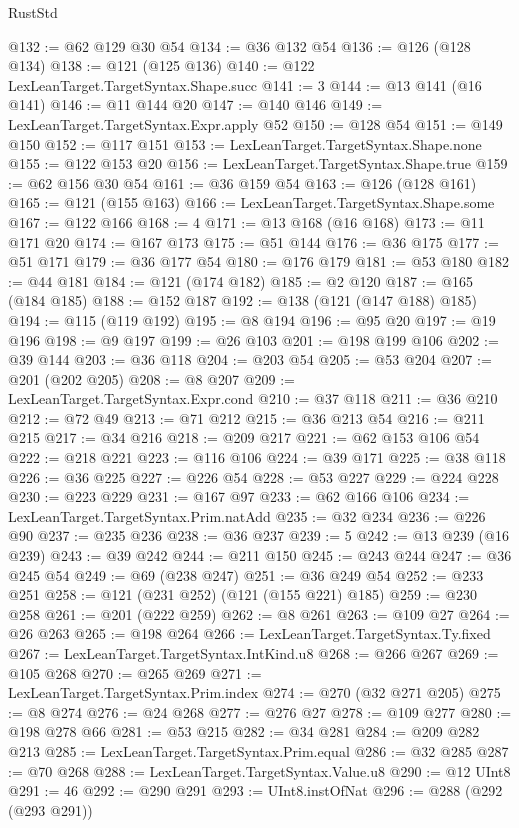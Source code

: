 \begin{lexlean}{RustStd}
\begin{coremodule}
@132 := @62 @129 @30 @54
@134 := @36 @132 @54
@136 := @126 (@128 @134)
@138 := @121 (@125 @136)
@140 := @122 LexLeanTarget.TargetSyntax.Shape.succ
@141 := 3
@144 := @13 @141 (@16 @141)
@146 := @11 @144 @20
@147 := @140 @146
@149 := LexLeanTarget.TargetSyntax.Expr.apply @52
@150 := @128 @54
@151 := @149 @150
@152 := @117 @151
@153 := LexLeanTarget.TargetSyntax.Shape.none
@155 := @122 @153 @20
@156 := LexLeanTarget.TargetSyntax.Shape.true
@159 := @62 @156 @30 @54
@161 := @36 @159 @54
@163 := @126 (@128 @161)
@165 := @121 (@155 @163)
@166 := LexLeanTarget.TargetSyntax.Shape.some
@167 := @122 @166
@168 := 4
@171 := @13 @168 (@16 @168)
@173 := @11 @171 @20
@174 := @167 @173
@175 := @51 @144
@176 := @36 @175
@177 := @51 @171
@179 := @36 @177 @54
@180 := @176 @179
@181 := @53 @180
@182 := @44 @181
@184 := @121 (@174 @182)
@185 := @2 @120
@187 := @165 (@184 @185)
@188 := @152 @187
@192 := @138 (@121 (@147 @188) @185)
@194 := @115 (@119 @192)
@195 := @8 @194
@196 := @95 @20
@197 := @19 @196
@198 := @9 @197
@199 := @26 @103
@201 := @198 @199 @106
@202 := @39 @144
@203 := @36 @118
@204 := @203 @54
@205 := @53 @204
@207 := @201 (@202 @205)
@208 := @8 @207
@209 := LexLeanTarget.TargetSyntax.Expr.cond
@210 := @37 @118
@211 := @36 @210
@212 := @72 @49
@213 := @71 @212
@215 := @36 @213 @54
@216 := @211 @215
@217 := @34 @216
@218 := @209 @217
@221 := @62 @153 @106 @54
@222 := @218 @221
@223 := @116 @106
@224 := @39 @171
@225 := @38 @118
@226 := @36 @225
@227 := @226 @54
@228 := @53 @227
@229 := @224 @228
@230 := @223 @229
@231 := @167 @97
@233 := @62 @166 @106
@234 := LexLeanTarget.TargetSyntax.Prim.natAdd
@235 := @32 @234
@236 := @226 @90
@237 := @235 @236
@238 := @36 @237
@239 := 5
@242 := @13 @239 (@16 @239)
@243 := @39 @242
@244 := @211 @150
@245 := @243 @244
@247 := @36 @245 @54
@249 := @69 (@238 @247)
@251 := @36 @249 @54
@252 := @233 @251
@258 := @121 (@231 @252) (@121 (@155 @221) @185)
@259 := @230 @258
@261 := @201 (@222 @259)
@262 := @8 @261
@263 := @109 @27
@264 := @26 @263
@265 := @198 @264
@266 := LexLeanTarget.TargetSyntax.Ty.fixed
@267 := LexLeanTarget.TargetSyntax.IntKind.u8
@268 := @266 @267
@269 := @105 @268
@270 := @265 @269
@271 := LexLeanTarget.TargetSyntax.Prim.index
@274 := @270 (@32 @271 @205)
@275 := @8 @274
@276 := @24 @268
@277 := @276 @27
@278 := @109 @277
@280 := @198 @278 @66
@281 := @53 @215
@282 := @34 @281
@284 := @209 @282 @213
@285 := LexLeanTarget.TargetSyntax.Prim.equal
@286 := @32 @285
@287 := @70 @268
@288 := LexLeanTarget.TargetSyntax.Value.u8
@290 := @12 UInt8
@291 := 46
@292 := @290 @291
@293 := UInt8.instOfNat
@296 := @288 (@292 (@293 @291))

\end{coremodule}
\end{lexlean}
